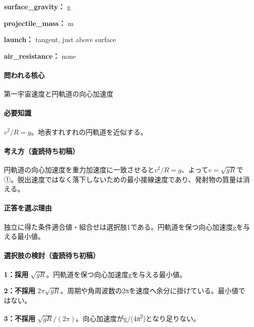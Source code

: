 \noindent\textbf{surface\_gravity：} g\par

\noindent\textbf{projectile\_mass：} m\par

\noindent\textbf{launch：} tangent, just above surface\par

\noindent\textbf{air\_resistance：} none\par

\paragraph{問われる核心} 第一宇宙速度と円軌道の向心加速度

\paragraph{必要知識} \(v^2/R=g\)。地表すれすれの円軌道を近似する。

\paragraph{考え方（査読待ち初稿）} 円軌道の向心加速度を重力加速度に一致させると\(v^2/R=g\)、よって\(v=\sqrt{gR}\)で①。脱出速度ではなく落下しないための最小接線速度であり、発射物の質量は消える。

\paragraph{正答を選ぶ理由} 独立に得た条件適合値・組合せは選択肢1である。円軌道を保つ向心加速度gを与える最小値。

\paragraph{選択肢の検討（査読待ち初稿）}\mbox{}\par

\noindent\textbf{1：採用} \(\sqrt{gR}\)。円軌道を保つ向心加速度gを与える最小値。\par

\noindent\textbf{2：不採用} \(2\pi\sqrt{gR}\)。周期や角周波数の2πを速度へ余分に掛けている。最小値ではない。\par

\noindent\textbf{3：不採用} \(\sqrt{gR}/(2\pi)\)。向心加速度がg/(4π\textsuperscript{2})となり足りない。\par

